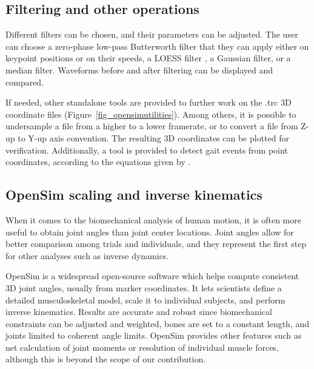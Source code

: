 \subsection{Filtering and other operations}

Different filters can be chosen, and their parameters can be adjusted. The user can choose a zero-phase low-pass Butterworth filter \cite{Butterworth1930} that they can apply either on keypoint positions or on their speeds, a LOESS filter \cite{Cleveland1981}, a Gaussian filter, or a median filter. Waveforms before and after filtering can be displayed and compared.

If needed, other standalone tools are provided to further work on the .trc 3D coordinate files (Figure~\ref{fig_opensimutilities}). Among others, it is possible to undersample a file from a higher to a lower framerate, or to convert a file from Z-up to Y-up axis convention. The resulting 3D coordinates can be plotted for verification. Additionally, a tool is provided to detect gait events from point coordinates, according to the equations given by \cite{Zeni2008}.


\subsection{OpenSim scaling and inverse kinematics}

When it comes to the biomechanical analysis of human motion, it is often more useful to obtain joint angles than joint center locations. Joint angles allow for better comparison among trials and individuals, and they represent the first step for other analyses such as inverse dynamics. 

OpenSim \cite{Delp2007,Seth2018} is a widespread open-source software which helps compute consistent 3D joint angles, usually from marker coordinates. It lets scientists define a detailed musculoskeletal model, scale it to individual subjects, and perform inverse kinematics. Results are accurate and robust since biomechanical constraints can be adjusted and weighted, bones are set to a constant length, and joints limited to coherent angle limits. OpenSim provides other features such as net calculation of joint moments or resolution of individual muscle forces, although this is beyond the scope of our contribution.

